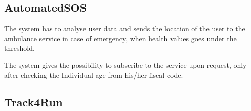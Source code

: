 \subsection{AutomatedSOS}

\begin{enumerate}[label={[}R2.\arabic*{]}, leftmargin=*]

    \item \label{R2-data-and-ambulance} The system has to analyse user data and sends the location of the user to the ambulance service in case of emergency, when health values goes under the threshold.
    
    \item \label{R2-subscription} The system gives the possibility to subscribe to the service upon request, only after checking the Individual age from his/her fiscal code.
\end{enumerate}


\subsection{Track4Run}

